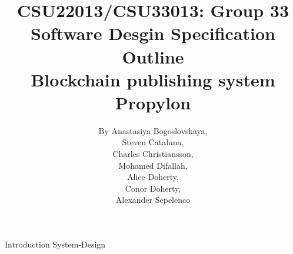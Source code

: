 \documentclass{article}
\title{
	{CSU22013/CSU33013: Group 33}\\
	{Software Desgin Specification Outline}\\
	{Blockchain publishing system}\\
	{\large Propylon}
}
\author{
	{By Anastasiya Bogoslovskaya,}\\
	{Steven Cataluna,} \\
	{Charles Christiansson,} \\
    {Mohamed Difallah,} \\
	{Alice Doherty,} \\
	{Conor Doherty,} \\
	{Alexander Sepelenco}
}
\date{} %
\begin{document}

\maketitle %
\tableofcontents %

{Introduction} 
{System-Design}
\end{document}

